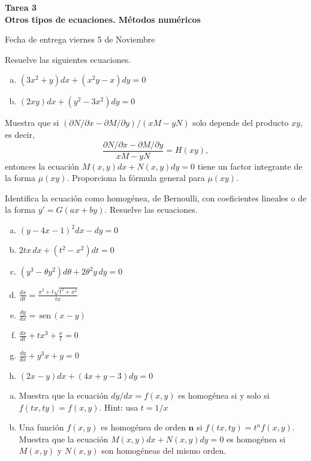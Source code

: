 \documentclass[12pt]{exam}
\renewcommand{\sin}{\,\text{sen}\,}
\begin{document}
\centering


\Large 
\textbf{\huge Tarea 3\\ \large Otros tipos de ecuaciones. Métodos numéricos}

\small
Fecha de entrega viernes 5 de Noviembre
\vskip10pt

\normalsize

\pointformat{\bfseries\boldmath(\thepoints)}
\vskip10pt

    
    \begin{questions}
     \question
     Resuelve las siguientes ecuaciones.
     \begin{enumerate} [a)]
			\item $(3x^2+y)dx+(x^2y-x)dy=0$
		  	\item $(2xy)dx+(y^2-3x^2)dy=0$
     \end{enumerate}

     
     \question
     Muestra que si $(\partial N/\partial x-\partial M/\partial y)/(xM-yN)$ solo depende del producto $xy$, es decir, $$\frac{\partial N/\partial x-\partial M/\partial y}{xM-yN}=H(xy),$$ entonces la ecuación $M(x,y)dx+N(x,y)dy=0$ tiene un factor integrante de la forma $\mu(xy)$. Proporciona la fórmula general para $\mu(xy)$.
     
     \question
     Identifica la ecuación como homogénea, de Bernoulli, con coeficientes lineales o de la forma $y'=G(ax+by)$. Resuelve las ecuaciones.
     \begin{enumerate}[a)]
     	\item $(y-4x-1)^2dx-dy=0$
        \item $2tx\,dx+(t^2-x^2)dt=0$
        \item $(y^3-\theta y^2)d\theta+2\theta^2y\,dy=0$
        \item $\frac{dx}{dt}=\frac{x^2+t\sqrt{t^2+x^2}}{tx}$
        \item $\frac{dy}{dx}= \sin(x-y)$
        \item $\frac{dx}{dt}+tx^3+\frac{x}{t}=0$
        \item $\frac{dy}{dx}+y^3x+y=0$
        \item $(2x-y)dx+(4x+y-3)dy=0$
       \end{enumerate}
        
     \question
     \begin{enumerate}[a)]
     		\item Muestra que la ecuación $dy/dx=f(x,y)$ es homogénea si y solo si $f(tx,ty)=f(x,y)$. Hint: usa $t=1/x$
            \item Una función $f(x,y)$ es homogénea de orden $\mathbf{n}$ si $f(tx,ty)=t^nf(x,y)$. Muestra que la ecuación $M(x,y)dx+N(x,y)dy=0$ es homogénea si $M(x,y)$ y $N(x,y)$ son homogéneas del mismo orden.
     \end{enumerate}
     


\end{questions}
\end{document}
